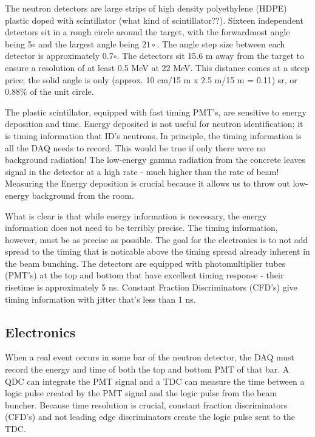 The neutron detectors are large strips of high density polyethylene (HDPE) plastic doped with scintillator (what kind of scintillator??).  Sixteen independent detectors sit in a rough circle around the target, with the forwardmost angle being 5$\circ$ and the largest angle being $21\circ$.  The angle step size between each detector is approximately 0.7$\circ$.  The detectors sit 15.6 m away from the target to ensure a resolution of at least 0.5 MeV at 22 MeV.  This distance comes at a steep price; the solid angle is only (approx. 10 cm/15 m x 2.5 m/15 m = 0.11) sr, or 0.88\% of the unit circle.


The plastic scintillator, equipped with fast timing PMT's, are sensitive to energy deposition and time.  Energy deposited is not useful for neutron identification; it is timing information that ID's neutrons.  In principle, the timing information is all the DAQ needs to record.  This would be true if only there were no background radiation!  The low-energy gamma radiation from the concrete leaves signal in the detector at a high rate - much higher than the rate of beam! Measuring the Energy deposition is crucial because it allows us to throw out low-energy background from the room.  

What is clear is that while energy information is necessary, the energy information does not need to be terribly precise.  The timing information, however, must be as precise as possible.  The goal for the electronics is to not add spread to the timing that is noticable above the timing spread already inherent in the beam bunching.  The detectors are equipped with photomultiplier tubes (PMT's) at the top and bottom that have excellent timing response - their risetime is approximately 5 ns.  Constant Fraction Discriminators (CFD's) give timing information with jitter that's less than 1 ns.

\subsection{Electronics}
When a real event occurs in some bar of the neutron detector, the DAQ must record the energy and time of both the top and bottom PMT of that bar.  A QDC can integrate the PMT signal and a TDC can measure the time between a logic pulse created by the PMT signal and the logic pulse from the beam buncher.  Because time resolution is crucial, constant fraction discriminators (CFD's) and not leading edge discriminators create the logic pulse sent to the TDC.  

